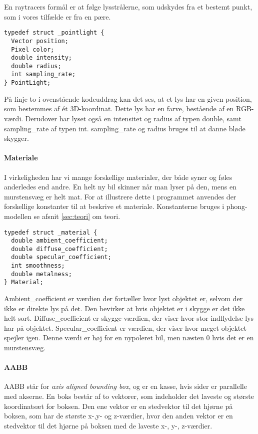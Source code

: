 En raytracers formål er at følge lysstrålerne, som udskydes fra et bestemt punkt, som i vores tilfælde er fra en pære. 

\begin{lstlisting}[style=Cstyle, caption=Struct til light]
typedef struct _pointlight {
  Vector position;
  Pixel color;
  double intensity;
  double radius;
  int sampling_rate;
} PointLight;
\end{lstlisting}

På linje to i ovenstående kodeuddrag kan det ses, at et lys har en given position, som bestemmes af ét 3D-koordinat. Dette lys har en farve, bestående af en RGB-værdi. Derudover har lyset også en intensitet og radius af typen double, samt sampling\_rate af typen int. sampling\_rate og radius bruges til at danne bløde skygger.

\paragraph{Materiale}
I virkeligheden har vi mange forskellige materialer, der både syner og føles anderledes end andre. En helt ny bil skinner når man lyser på den, mens en murstensvæg er helt mat. For at illustrere dette i programmet anvendes der forskellige konstanter til at beskrive et materiale. Konstanterne bruges i phong-modellen se afsnit \ref{sec:teori} om teori.

\begin{lstlisting}[style=Cstyle, caption=Struct til Material]
typedef struct _material {
  double ambient_coefficient;
  double diffuse_coefficient;
  double specular_coefficient;
  int smoothness;
  double metalness; 
} Material;
\end{lstlisting}

Ambient\_coefficient er værdien der fortæller hvor lyst objektet er, selvom der ikke er direkte lys på det. Den bevirker at hvis objektet er i skygge er det ikke helt sort.
Diffuse\_coefficient er skygge-værdien, der viser hvor stor indflydelse lys har på objektet. 
Specular\_coefficient er værdien, der viser hvor meget objektet spejler igen. Denne værdi er høj for en nypoleret bil, men næsten 0 hvis det er en murstensvæg.

\paragraph{AABB}
AABB står for \textit{axis aligned bounding box}, og er en kasse, hvis sider er parallelle med akserne. En boks består af to vektorer, som indeholder det laveste og største koordinatsæt for boksen. Den ene vektor er en stedvektor til det hjørne på boksen, som har de største x-,y- og z-værdier, hvor den anden vektor er en stedvektor til det hjørne på boksen med de laveste x-, y-, z-værdier. 

